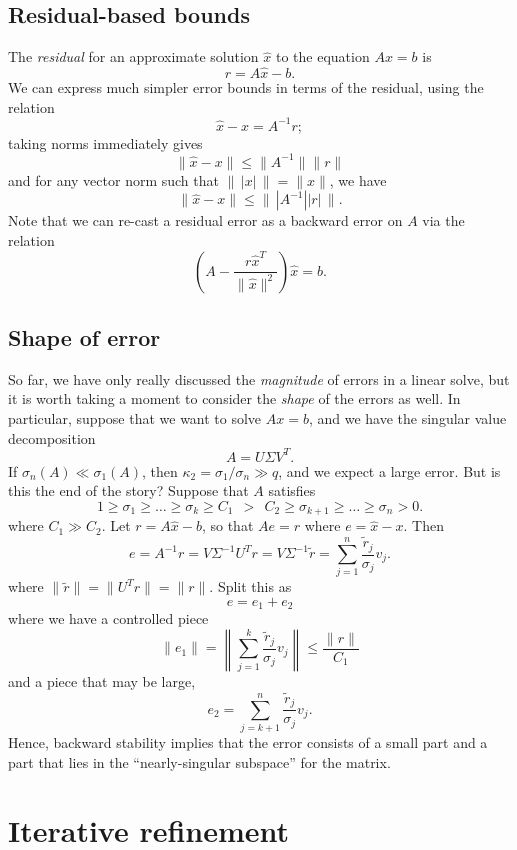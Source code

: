 \documentclass[12pt, leqno]{article} %
\begin{document}
\subsection{Residual-based bounds}

The {\em residual} for an approximate solution $\hat{x}$ to the
equation $Ax = b$ is
\[
  r = A \hat{x} - b.
\]
We can express much simpler error bounds in terms of the residual,
using the relation
\[
  \hat{x}-x = A^{-1} r;
\]
taking norms immediately gives
\[
  \|\hat{x}-x\| \leq \|A^{-1}\| \|r\|
\]
and for any vector norm such that $\|\,|x|\,\|=\|x\|$, we have
\[
  \|\hat{x}-x\| \leq \| \, |A^{-1}| |r| \, \|.
\]
Note that we can re-cast a residual error as a backward error on $A$
via the relation
\[
  \left( A - \frac{r\hat{x}^T}{\|\hat{x}\|^2} \right) \hat{x} = b.
\]

\subsection{Shape of error}

So far, we have only really discussed the {\em magnitude} of
errors in a linear solve, but it is worth taking a moment to
consider the {\em shape} of the errors as well.  In particular,
suppose that we want to solve $Ax = b$, and we have the
singular value decomposition
\[
  A = U \Sigma V^T.
\]
If $\sigma_n(A) \ll \sigma_1(A)$, then $\kappa_2 = \sigma_1/\sigma_n \gg q$,
and we expect a large error.  But is this the end of the story?
Suppose that $A$ satisfies
\[
  1 \geq \sigma_1 \geq \ldots \geq \sigma_k \geq C_1 ~~ > ~~
  C_2 \geq \sigma_{k+1} \geq \ldots \geq \sigma_n > 0.
\]
where $C_1 \gg C_2$.  Let $r = A \hat{x} - b$, so that $Ae = r$
where $e = \hat{x}-x$.  Then
\[
  e = A^{-1} r = V \Sigma^{-1} U^T r = V \Sigma^{-1} \tilde{r}
    = \sum_{j=1}^n \frac{\tilde{r}_j}{\sigma_j} v_j.
\]
where $\|\tilde{r}\| = \|U^T r\| = \|r\|$.  Split this as
\[
  e = e_1 + e_2
\]
where we have a controlled piece
\[
  \|e_1\| = \left\| \sum_{j=1}^k \frac{\tilde{r}_j}{\sigma_j} v_j \right\|
          \leq \frac{\|r\|}{C_1}
\]
and a piece that may be large,
\[
  e_2 = \sum_{j={k+1}}^n \frac{\tilde{r}_j}{\sigma_j} v_j.
\]
Hence, backward stability implies that the error consists of a small
part and a part that lies in the ``nearly-singular subspace'' for the
matrix.

\section{Iterative refinement}
\end{document}
